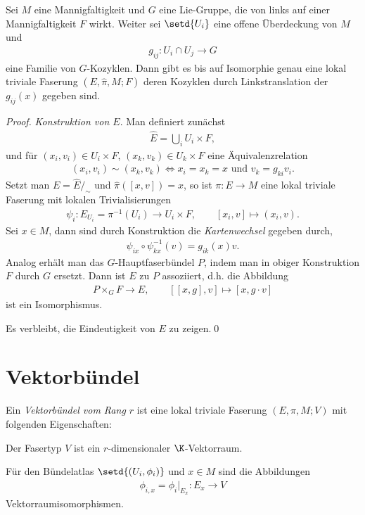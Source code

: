 \documentclass[%
	paper=a5,%
	fleqn,%
	DIV=18,%
	BCOR=0mm,
	fontsize=11pt,
	titlepage=false,%
	bibliography=totoc,
	DIV=18,%
	twoside=true,
	pdftitle=Riemannsche Geometrie,
	pdfauthor=Uwe Semmelmann,
	numbers=noendperiod]%
	{scrbook}
\begin{document}
\begin{prop}
\label{prop:Kozyklen-bestimmen-AFB-HFB}
Sei $M$ eine Mannigfaltigkeit und $G$ eine Lie-Gruppe, die von links auf einer
Mannigfaltigkeit $F$ wirkt. Weiter sei $\setd{U_i}$ eine offene Überdeckung
von $M$ und
\begin{align*}
g_{ij}\colon U_i\cap U_j\to G
\end{align*}
eine Familie von $G$-Kozyklen. Dann gibt es bis auf Isomorphie genau eine lokal
triviale Faserung $(E,\hat{\pi},M;F)$ deren Kozyklen durch Linkstranslation der
$g_{ij}(x)$ gegeben sind.\fish
\end{prop}
\begin{proof}
\textit{Konstruktion von $E$}. Man definiert zunächst
\begin{align*}
\hat{E} = \bigcup_{i} U_i\times F,
\end{align*}
und für $(x_i,v_i)\in U_i\times F$, $(x_k,v_k)\in U_k\times F$ eine
Äquivalenzrelation
\begin{align*}
(x_i,v_i)\sim (x_k,v_k) 
\iff x_i = x_k = x \text{ und }
v_k = g_{ki}v_i.
\end{align*}
Setzt man $E = \hat{E}/_\sim$ und $\hat{\pi}([x,v]) = x$, so ist $\pi\colon E\to M$
eine lokal triviale Faserung mit lokalen Trivialisierungen
\begin{align*}
\psi_i : E_{U_i} = \pi^{-1}(U_i) \to U_i\times F,\qquad [x_i,v]\mapsto (x_i,v).
\end{align*}
Sei $x\in M$, dann sind durch Konstruktion die \textit{Kartenwechsel} gegeben
durch,
\begin{align*}
\psi_{ix}\circ \psi_{kx}^{-1}(v) = g_{ik}(x)v.
\end{align*}
Analog erhält man das $G$-Hauptfaserbündel $P$, indem man in obiger Konstruktion
$F$ durch $G$ ersetzt.
Dann ist $E$ zu $P$ assoziiert, d.h. die Abbildung
\begin{align*}
P\times_G F\to E,\qquad [[x,g],v]\mapsto [x,g\cdot v]
\end{align*}
ist ein Isomorphismus.

Es verbleibt, die Eindeutigkeit von $E$ zu zeigen.\qed
\end{proof}

\section{Vektorbündel}

\begin{defn}
Ein \emph{Vektorbündel vom Rang $r$} ist eine lokal triviale Faserung
$(E,\pi,M;V)$ mit folgenden Eigenschaften:
\begin{defnenum}
\item Der Fasertyp $V$ ist ein $r$-dimensionaler $\K$-Vektorraum.
\item Für den Bündelatlas $\setd{(U_i,\phi_i)}$ und $x\in M$ sind die
Abbildungen
\begin{align*}
\phi_{i,x} = \phi_i\big|_{E_x}  : E_x \to V
\end{align*}
Vektorraumisomorphismen.\fish
\end{defnenum}
\end{defn}
\end{document}
